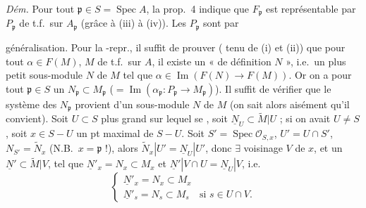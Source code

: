 \documentclass[11pt,a4paper]{article}
\begin{document}
\emph{Dém.} Pour tout $\mathfrak{p} \in S = \operatorname{Spec} A$, la prop.~4
indique que $F_{\mathfrak{p}}$ est représentable par $P_{\mathfrak{p}}$ de
t.f.\ sur $A_{\mathfrak{p}}$ (grâce à (iii) à (iv)). Les $P_{\mathfrak{p}}$
sont \ill{} par

généralisation. Pour  la -repr., il suffit
de prouver ( tenu de (i) et (ii)) que pour tout
$\alpha \in F(M)$, $M$ de t.f.\ sur $A$, il existe un «  de
définition $N$ », i.e.\ un plus petit sous-module $N$ de $M$ tel que
$\alpha \in \operatorname{Im}(F(N) \to F(M))$. Or on a pour tout
$\mathfrak{p} \in S$ un $N_{\mathfrak{p}} \subset M_{\mathfrak{p}}$
($= \operatorname{Im}(\alpha_{\mathfrak{p}} \colon P_{\mathfrak{p}} \to
M_{\mathfrak{p}})$).  Il suffit de vérifier que le système des
$N_{\mathfrak{p}}$ provient d'un sous-module $N$ de $M$ (on sait alors aisément
qu'il convient). Soit $U \subset S$  plus grand \ill{} sur
lequel se , soit $\underline{N}_U \subset \widetilde{M}|U$ ;
\struck{\ill{}} si on avait $U \neq S$, soit $x \in S - U$ un pt maximal de
$S - U$. Soit $S' = \operatorname{Spec} \mathcal{O}_{S,x}$,
 $U' = U \cap S'$, 
$N_{S'} = \widetilde{N}_x$ (N.B.\ $x = \mathfrak{p}$ !), alors
$\widetilde{N}_x | U' = \underline{N}_U | U'$, donc $\exists$ voisinage
 $V$ de $x$, \struck{\ill{}} et un
$\underline{N}' \subset \widetilde{M}|V$, tel que
$\underline{N}'_x = N_x \subset M_x$ et
$\underline{N}' | V \cap U = \underline{N}_U | V$, i.e.
\[
  \begin{cases}
    \underline{N}'_x = N_x \subset M_x \\
    \underline{N}'_s = N_s \subset M_s & \text{si } s \in U \cap V.
  \end{cases}
\]
\end{document}
